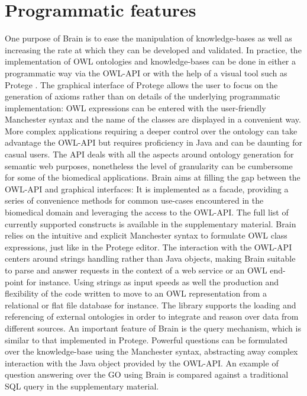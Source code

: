\documentclass{bioinfo}
\begin{document}
\section{Programmatic features}
One purpose of Brain is to ease the manipulation of knowledge-bases as well as increasing the rate at 
which they can be developed and validated.
In practice, the implementation of OWL ontologies and knowledge-bases can be done in either a programmatic way 
via the OWL-API \citep{MatthewHorridge2011} or with the
help of a visual tool such as Protege \citep{StanfordCenterforBiomedicalInformaticsResearch}. 
The graphical interface of Protege allows the user to focus 
on the generation of axioms rather than on details of the underlying programmatic implementation:
OWL expressions can be entered 
with the user-friendly Manchester syntax \citep{Horridge2006} and the name of the classes are displayed in a convenient way. 
More complex applications requiring a deeper control over the ontology
can take advantage the OWL-API but requires proficiency in Java and can be daunting for casual users.
The API deals with all the aspects around ontology generation for semantic web purposes, nonetheless the 
level of granularity can be cumbersome for some of the biomedical applications. Brain aims at filling the gap between the OWL-API
and graphical interfaces: It is implemented as a facade, providing a series of convenience methods for common
use-cases encountered in the biomedical domain and leveraging the access to the OWL-API. 
The full list of currently supported constructs is available in the supplementary material.
Brain relies on the intuitive and explicit Manchester syntax to formulate OWL class expressions, just like in the Protege editor.
The interaction with the OWL-API centers around strings handling rather than Java objects, making Brain suitable to parse and answer requests in 
the context of a web service or an OWL end-point for instance. Using strings as input speeds as well the production 
and flexibility of the code written to move to an OWL representation from a relational or flat file database for instance.
The library supports the loading and referencing of external ontologies in order to integrate and reason
over data from different sources. An important feature of Brain is the query mechanism, which is similar to 
that implemented in Protege. Powerful questions can be formulated over the knowledge-base using the Manchester syntax, abstracting
away complex interaction with the Java object provided by the OWL-API. An example of question answering over the GO using Brain
is compared against a traditional SQL query in the supplementary material.
\end{document}
